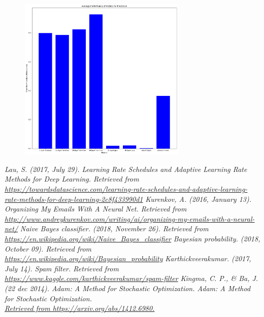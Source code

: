 \documentclass[a4paper,11pt]{article}
\begin{document}
\begin{figure}
\centering
\includegraphics[width=8cm]{Preformance}
\caption{}
\label{fig-7}
\end{figure}
\begin{thebibliography}{9}
\textit{Lau, S. (2017, July 29). Learning Rate Schedules and Adaptive Learning Rate Methods for Deep Learning. Retrieved from 
\\{\tiny\url{https://towardsdatascience.com/learning-rate-schedules-and-adaptive-learning-rate-methods-for-deep-learning-2c8f433990d1}}}
\textit{Kurenkov, A. (2016, January 13). Organizing My Emails With A Neural Net. Retrieved from \\
{\tiny\url{http://www.andreykurenkov.com/writing/ai/organizing-my-emails-with-a-neural-net/}}}
\textit{Naive Bayes classifier. (2018, November 26). Retrieved from \\
{\tiny\url{https://en.wikipedia.org/wiki/Naive_Bayes_classifier}}}
\textit{Bayesian probability. (2018, October 09). Retrieved from \\
{\tiny\url{https://en.wikipedia.org/wiki/Bayesian_probability}}}
\textit{Karthickveerakumar. (2017, July 14). Spam filter. Retrieved from\\
{\tiny\url{ https://www.kaggle.com/karthickveerakumar/spam-filter}}}
\textit{Kingma, C. P., \& Ba, J. (22 dec 2014). Adam: A Method for Stochastic Optimization. Adam: A Method for Stochastic Optimization.\\
{\tiny\url{ Retrieved from https://arxiv.org/abs/1412.6980.}}}

\end{thebibliography}
\end{document}
